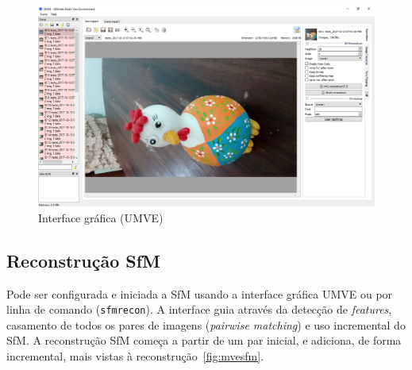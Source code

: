 \begin{figure}[!h]
	\centering
	\includegraphics[width=\linewidth]{figs/umve1.png}
	\caption{%
	Interface gráfica (UMVE)%
	}\label{fig:umve:gui}
\end{figure}
\subsection*{Reconstrução SfM}

Pode ser configurada e iniciada a SfM usando a interface gráfica UMVE ou por linha de
comando (\texttt{sfmrecon}). A interface guia através da detecção de
\emph{features}, casamento de todos os pares de imagens (\emph{pairwise matching}) e uso
incremental do SfM. A reconstrução SfM começa a partir de um
par inicial, e adiciona, de forma incremental, mais vistas à
reconstrução~\ref{fig:mvesfm}.

